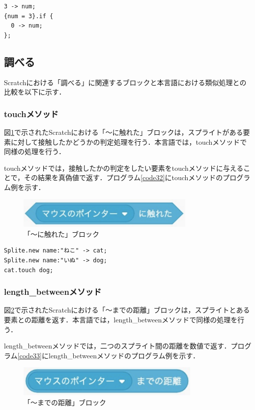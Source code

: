 \documentclass[10pt,a4j]{ltjsarticle}
\begin{document}
\begin{lstlisting}[caption=ifメソッドのプログラム例, label=code31]
3 -> num;
{num = 3}.if { 
  0 -> num;
};
\end{lstlisting}

\subsection{調べる}
Scratchにおける「調べる」に関連するブロックと本言語における類似処理との比較を以下に示す．
\subsubsection{touchメソッド}
図\ref{fig:touch}で示されたScratchにおける「〜に触れた」ブロックは，スプライトがある要素に対して接触したかどうかの判定処理を行う．本言語では，touchメソッドで同様の処理を行う．

touchメソッドでは，接触したかの判定をしたい要素をtouchメソッドに与えることで，その結果を真偽値で返す．プログラム\ref{code32}にtouchメソッドのプログラム例を示す．
\begin{figure}[H]
  \centering
  \includegraphics[height=15mm]{images/touch.pdf}
  \caption{「〜に触れた」ブロック}
  \label{fig:touch}
\end{figure}

\begin{lstlisting}[caption=touchメソッドのプログラム例, label=code32]
Splite.new name:"ねこ" -> cat;
Splite.new name:"いぬ" -> dog;
cat.touch dog;
\end{lstlisting}

\subsubsection{length\_betweenメソッド}
図\ref{fig:length}で示されたScratchにおける「〜までの距離」ブロックは，スプライトとある要素との距離を返す．本言語では，length\_betweenメソッドで同様の処理を行う．

length\_betweenメソッドでは，二つのスプライト間の距離を数値で返す．プログラム\ref{code33}にlength\_betweenメソッドのプログラム例を示す．

\begin{figure}[H]
  \centering
  \includegraphics[height=15mm]{images/mouse.pdf}
  \caption{「〜までの距離」ブロック}
  \label{fig:length}
\end{figure}
\end{document}
